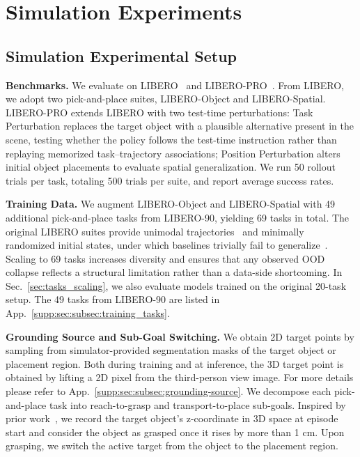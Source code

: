 \section{Simulation Experiments}
\label{sec:sim_exp}
\subsection{Simulation Experimental Setup}
\noindent\textbf{Benchmarks.} We evaluate on LIBERO~\cite{libero} and LIBERO-PRO~\cite{zhou2025liberopro}. From LIBERO, we adopt two pick-and-place suites, LIBERO-Object and LIBERO-Spatial. LIBERO-PRO extends LIBERO with two test-time perturbations: Task Perturbation replaces the target object with a plausible alternative present in the scene, testing whether the policy follows the test-time instruction rather than replaying memorized task–trajectory associations; Position Perturbation alters initial object placements to evaluate spatial generalization. We run 50 rollout trials per task, totaling 500 trials per suite, and report average success rates.

\noindent\textbf{Training Data.}
We augment LIBERO-Object and LIBERO-Spatial with 49 additional pick-and-place tasks from LIBERO-90, yielding 69 tasks in total. The original LIBERO suites provide unimodal trajectories~\cite{zhou2025liberopro} and minimally randomized initial states, under which baselines trivially fail to generalize~\cite{steerablepolicy}. Scaling to 69 tasks increases diversity and ensures that any observed OOD collapse reflects a structural limitation rather than a data-side shortcoming. In Sec.~\ref{sec:tasks_scaling}, we also evaluate models trained on the original 20-task setup. The 49 tasks from LIBERO-90 are listed in App.~\ref{supp:sec:subsec:training_tasks}.

\noindent\textbf{Grounding Source and Sub-Goal Switching.}
We obtain 2D target points by sampling from simulator-provided segmentation masks of the target object or placement region. Both during training and at inference, the 3D target point is obtained by lifting a 2D pixel from the third-person view image. For more details please refer to App.~\ref{supp:sec:subsec:grounding-source}. We decompose each pick-and-place task into reach-to-grasp and transport-to-place sub-goals. Inspired by prior work~\cite{deng2025graspvla}, we record the target object's z-coordinate in 3D space at episode start and consider the object as grasped once it rises by more than 1 cm. Upon grasping, we switch the active target from the object to the placement region.

